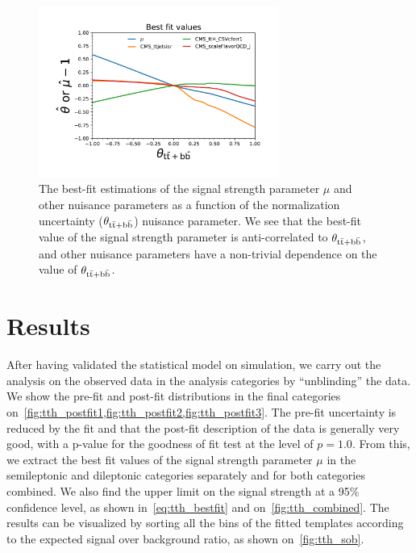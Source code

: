 \begin{figure}
\begin{centering}
\includegraphics[width = 0.7\textwidth]{figures/tth/nuis_scan.pdf}
\caption[The best-fit estimations of nuisance parameters as a function of the $\theta_{\ttbb}$ nuisance parameter]{The best-fit estimations of the signal strength parameter $\mu$ and other nuisance parameters as a function of the \ttbb\xspace normalization uncertainty ($\theta_{\ttbb}$) nuisance parameter. We see that the best-fit value of the signal strength parameter is anti-correlated to $\theta_{\ttbb}$, and other nuisance parameters have a non-trivial dependence on the value of $\theta_{\ttbb}$.}
\label{fig:tth_nuis_scan}
\end{centering}
\end{figure}

\section{Results}
\label{sec:tth_results}
After having validated the statistical model on simulation, we carry out the analysis on the observed data in the analysis categories by ``unblinding'' the data. We show the pre-fit and post-fit distributions in the final categories on~\cref{fig:tth_postfit1,fig:tth_postfit2,fig:tth_postfit3}. The pre-fit uncertainty is reduced by the fit and that the post-fit description of the data is generally very good, with a p-value for the goodness of fit test at the level of $p=1.0$. From this, we extract the best fit values of the signal strength parameter $\mu$ in the semileptonic and dileptonic categories separately and for both categories combined. We also find the upper limit on the signal strength at a 95\% confidence level, as shown in~\cref{eq:tth_bestfit} and on~\cref{fig:tth_combined}. The results can be visualized by sorting all the bins of the fitted templates according to the expected signal over background ratio, as shown on~\cref{fig:tth_sob}.

